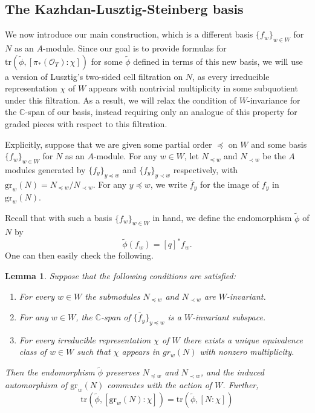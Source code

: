 \documentclass{amsart}
\newtheorem{lemma}[thm]{Lemma}
\theoremstyle{definition}
\renewcommand{\O}{\mathcal{O}}
\begin{document}
\subsection{The Kazhdan-Lusztig-Steinberg basis}\label{sec:klstein}

We now introduce our main construction, which is a different basis $\{f_w\}_{w \in W}$ for $N$ as an $A$-module. Since our goal is to provide formulas for $\mathrm{tr}(\tilde{\phi}, [\pi_*(\O_T) : \chi])$ for some $\tilde{\phi}$ defined in terms of this new basis, we will use a version of Lusztig's two-sided cell filtration on $N$, as every irreducible representation $\chi$ of $W$ appears with nontrivial multiplicity in some subquotient under this filtration. As a result, we will relax the condition of $W$-invariance for the $\mathbb{C}$-span of our basis, instead requiring only an analogue of this property for graded pieces with respect to this filtration.

Explicitly, suppose that we are given some partial order $\preceq$ on $W$ and some basis $\{f_w\}_{w \in W}$ for $N$ as an $A$-module. For any $w \in W$, let $N_{\preceq w}$ and $N_{\prec w}$ be the $A$ modules generated by $\{f_y\}_{y \preceq w}$ and $\{f_y\}_{y \prec w}$ respectively, with $\mathrm{gr}_w(N) = N_{\preceq w}/N_{\prec w}$. For any $y \preceq w$, we write $\bar f_y$ for the image of $f_y$ in $\mathrm{gr}_w(N)$.

Recall that with such a basis $\{f_w\}_{w \in W}$ in hand, we define the endomorphism $\tilde{\phi}$ of $N$ by
\begin{equation*}
    \tilde{\phi}(f_w) = [q]^*f_w.
\end{equation*}
One can then easily check the following.

\begin{lemma}\label{lem:fil}
Suppose that the following conditions are satisfied:
\begin{enumerate}[label=(\roman*)]
\item For every $w\in W$ the submodules $N_{\preceq w}$ and $N_{\prec w}$ are $W$-invariant.\label{enum:submodules}

\item For any $w \in W$, the $\mathbb{C}$-span of $\{\bar f_y\}_{y \preceq w}$ is a $W$-invariant subspace.\label{enum:winvariant}

\item For every irreducible representation $\chi$ of $W$ there exists a unique equivalence class of $w\in W$ such that $\chi$ appears in $gr_w(N)$ with nonzero multiplicity.\label{enum:irreps}
\end{enumerate}
Then the endomorphism $\tilde \phi$ preserves $N_{\preceq w}$ and $N_{\prec w}$, and the induced automorphism of $\mathrm{gr}_w(N)$ commutes with the action of $W$. Further,
\begin{equation*}
    \mathrm{tr}(\tilde{\phi}, [\mathrm{gr}_w(N) : \chi]) = \mathrm{tr}(\tilde{\phi}, [N : \chi])
\end{equation*}
\end{lemma}
\end{document}

